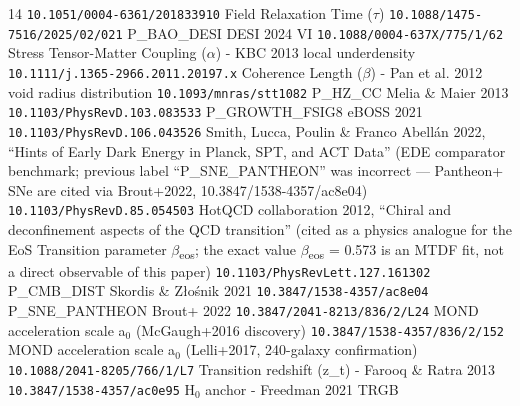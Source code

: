\documentclass[11pt,a4paper]{article}
\begin{document}
\begin{thebibliography}{14}
 \texttt{10.1051/\allowbreak{}0004-6361/\allowbreak{}201833910} Field Relaxation Time ($\tau$)
 \texttt{10.1088/\allowbreak{}1475-7516/\allowbreak{}2025/\allowbreak{}02/\allowbreak{}021} P\_\allowbreak{}BAO\_\allowbreak{}DESI DESI 2024 VI
 \texttt{10.1088/\allowbreak{}0004-637X/\allowbreak{}775/\allowbreak{}1/\allowbreak{}62} Stress Tensor-Matter Coupling ($\alpha$) - KBC 2013 local underdensity
 \texttt{10.1111/\allowbreak{}j.1365-2966.2011.20197.x} Coherence Length ($\beta$) - Pan et al. 2012 void radius distribution
 \texttt{10.1093/\allowbreak{}mnras/\allowbreak{}stt1082} P\_\allowbreak{}HZ\_\allowbreak{}CC Melia \& Maier 2013
 \texttt{10.1103/\allowbreak{}PhysRevD.103.083533} P\_\allowbreak{}GROWTH\_\allowbreak{}FSIG8 eBOSS 2021
 \texttt{10.1103/\allowbreak{}PhysRevD.106.043526} Smith, Lucca, Poulin \& Franco Abell\'an 2022, ``Hints of Early Dark Energy in Planck, SPT, and ACT Data'' (EDE comparator benchmark; previous label ``P\_\allowbreak{}SNE\_\allowbreak{}PANTHEON'' was incorrect --- Pantheon+ SNe are cited via Brout+2022, 10.3847/\allowbreak{}1538-4357/\allowbreak{}ac8e04)
 \texttt{10.1103/\allowbreak{}PhysRevD.85.054503} HotQCD collaboration 2012, ``Chiral and deconfinement aspects of the QCD transition'' (cited as a physics analogue for the EoS Transition parameter $\beta$\textsubscript{eos}; the exact value $\beta$\textsubscript{eos} = 0.573 is an MTDF fit, not a direct observable of this paper)
 \texttt{10.1103/\allowbreak{}PhysRevLett.127.161302} P\_\allowbreak{}CMB\_\allowbreak{}DIST Skordis \& Z\l{}o\'snik 2021
 \texttt{10.3847/\allowbreak{}1538-4357/\allowbreak{}ac8e04} P\_\allowbreak{}SNE\_\allowbreak{}PANTHEON Brout+ 2022
 \texttt{10.3847/\allowbreak{}2041-8213/\allowbreak{}836/\allowbreak{}2/\allowbreak{}L24} MOND acceleration scale a$_{0}$ (McGaugh+2016 discovery)
 \texttt{10.3847/\allowbreak{}1538-4357/\allowbreak{}836/\allowbreak{}2/\allowbreak{}152} MOND acceleration scale a$_{0}$ (Lelli+2017, 240-galaxy confirmation)
 \texttt{10.1088/\allowbreak{}2041-8205/\allowbreak{}766/\allowbreak{}1/\allowbreak{}L7} Transition redshift (z\_\allowbreak{}t) - Farooq \& Ratra 2013
 \texttt{10.3847/\allowbreak{}1538-4357/\allowbreak{}ac0e95} H$_{0}$ anchor - Freedman 2021 TRGB
\end{thebibliography}
\end{document}
